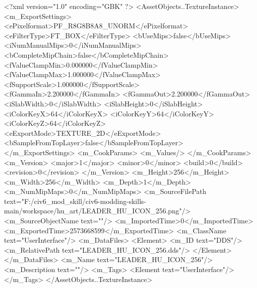 <?xml version="1.0" encoding="GBK" ?>
<AssetObjects..TextureInstance>
	<m_ExportSettings>
		<ePixelformat>PF_R8G8B8A8_UNORM</ePixelformat>
		<eFilterType>FT_BOX</eFilterType>
		<bUseMips>false</bUseMips>
		<iNumManualMips>0</iNumManualMips>
		<bCompleteMipChain>false</bCompleteMipChain>
		<fValueClampMin>0.000000</fValueClampMin>
		<fValueClampMax>1.000000</fValueClampMax>
		<fSupportScale>1.000000</fSupportScale>
		<fGammaIn>2.200000</fGammaIn>
		<fGammaOut>2.200000</fGammaOut>
		<iSlabWidth>0</iSlabWidth>
		<iSlabHeight>0</iSlabHeight>
		<iColorKeyX>64</iColorKeyX>
		<iColorKeyY>64</iColorKeyY>
		<iColorKeyZ>64</iColorKeyZ>
		<eExportMode>TEXTURE_2D</eExportMode>
		<bSampleFromTopLayer>false</bSampleFromTopLayer>
	</m_ExportSettings>
	<m_CookParams>
		<m_Values/>
	</m_CookParams>
	<m_Version>
		<major>1</major>
		<minor>0</minor>
		<build>0</build>
		<revision>0</revision>
	</m_Version>
	<m_Height>256</m_Height>
	<m_Width>256</m_Width>
	<m_Depth>1</m_Depth>
	<m_NumMipMaps>0</m_NumMipMaps>
	<m_SourceFilePath text="F:/civ6_mod_skill/civ6-modding-skills-main/workspace/hu_art/LEADER_HU_ICON_256.png"/>
	<m_SourceObjectName text=""/>
	<m_ImportedTime>0</m_ImportedTime>
	<m_ExportedTime>2573668599</m_ExportedTime>
	<m_ClassName text="UserInterface"/>
	<m_DataFiles>
		<Element>
			<m_ID text="DDS"/>
			<m_RelativePath text="LEADER_HU_ICON_256.dds"/>
		</Element>
	</m_DataFiles>
	<m_Name text="LEADER_HU_ICON_256"/>
	<m_Description text=""/>
	<m_Tags>
		<Element text="UserInterface"/>
	</m_Tags>
</AssetObjects..TextureInstance>
